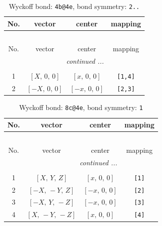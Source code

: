 \documentclass[fleqn,8pt]{jsarticle}
\begin{document}
\renewcommand{\arraystretch}{1.2}
\begin{longtable}{cccc}
\caption{Wyckoff bond: {\tt 4b@4e}, bond symmetry: {\tt 2..}}
 \\
 \hline \hline
No. & vector & center & mapping \\ \hline \endfirsthead

\multicolumn{3}{l}{\tablename\ \thetable{}} \\
 \hline \hline
No. & vector & center & mapping \\ \hline \endhead

 \hline \hline
\multicolumn{3}{r}{\footnotesize\it continued ...} \\ \endfoot

 \hline \hline
\multicolumn{3}{r}{} \\ \endlastfoot

1 & $\left[ X,\, 0,\, 0 \right]$ & $\left[ x,\, 0,\, 0 \right]$ & {\tt [1,4]} \\ \hline
2 & $\left[ - X,\, 0,\, 0 \right]$ & $\left[ - x,\, 0,\, 0 \right]$ & {\tt [2,3]} \\
\end{longtable}
\renewcommand{\arraystretch}{1.2}
\begin{longtable}{cccc}
\caption{Wyckoff bond: {\tt 8c@4e}, bond symmetry: {\tt 1}}
 \\
 \hline \hline
No. & vector & center & mapping \\ \hline \endfirsthead

\multicolumn{3}{l}{\tablename\ \thetable{}} \\
 \hline \hline
No. & vector & center & mapping \\ \hline \endhead

 \hline \hline
\multicolumn{3}{r}{\footnotesize\it continued ...} \\ \endfoot

 \hline \hline
\multicolumn{3}{r}{} \\ \endlastfoot

1 & $\left[ X,\, Y,\, Z \right]$ & $\left[ x,\, 0,\, 0 \right]$ & {\tt [1]} \\ \hline
2 & $\left[ - X,\, - Y,\, Z \right]$ & $\left[ - x,\, 0,\, 0 \right]$ & {\tt [2]} \\ \hline
3 & $\left[ - X,\, Y,\, - Z \right]$ & $\left[ - x,\, 0,\, 0 \right]$ & {\tt [3]} \\ \hline
4 & $\left[ X,\, - Y,\, - Z \right]$ & $\left[ x,\, 0,\, 0 \right]$ & {\tt [4]} \\
\end{longtable}
\end{document}
